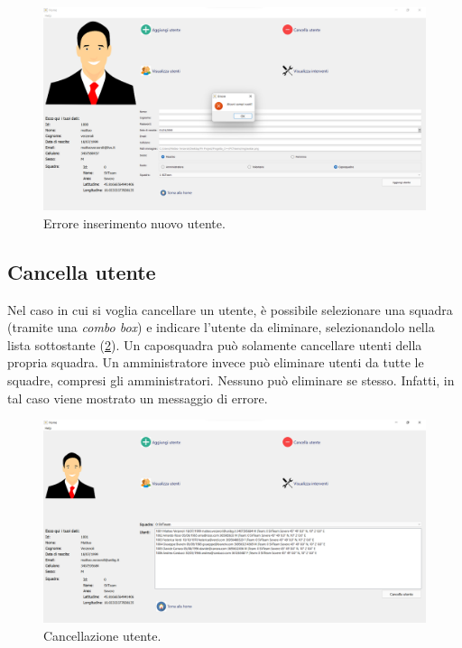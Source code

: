 \begin{figure}[h!]
	\centering
	\includegraphics[width=1\linewidth]{./ImageFiles/new_user_error}
	\caption{Errore inserimento nuovo utente.}
	\label{fig:new_user_error}
\end{figure}

\subsection{Cancella utente}
Nel caso in cui si voglia cancellare un utente, è possibile selezionare una squadra (tramite una \textit{combo box}) e indicare l'utente da eliminare, selezionandolo nella lista sottostante (\Fig\ref{fig:delete_user}). Un caposquadra può solamente cancellare utenti della propria squadra. Un amministratore invece può eliminare utenti da tutte le squadre, compresi gli amministratori. Nessuno può eliminare se stesso. Infatti, in tal caso viene mostrato un messaggio di errore.

\begin{figure}[h!]
	\centering
	\includegraphics[width=1\linewidth]{./ImageFiles/delete_user}
	\caption{Cancellazione utente.}
	\label{fig:delete_user}
\end{figure}

